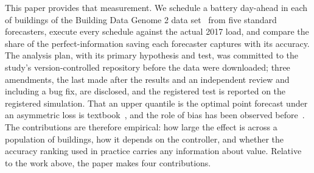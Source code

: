 This paper provides that measurement. We schedule a battery day-ahead in each of  buildings of the Building Data Genome 2 data set~\cite{miller2020bdg2} from five standard forecasters, execute every schedule against the actual 2017 load, and compare the share of the perfect-information saving each forecaster captures with its accuracy. The analysis plan, with its primary hypothesis and test, was committed to the study's version-controlled repository before the data were downloaded; three amendments, the last made after the results and an independent review and including a bug fix, are disclosed, and the registered test is reported on the registered simulation. That an upper quantile is the optimal point forecast under an asymmetric loss is textbook~\cite{gneiting2011point,pinson2007trading}, and the role of bias has been observed before~\cite{katholnigg2025impact}. The contributions are therefore empirical: how large the effect is across a population of buildings, how it depends on the controller, and whether the accuracy ranking used in practice carries any information about value. Relative to the work above, the paper makes four contributions.
